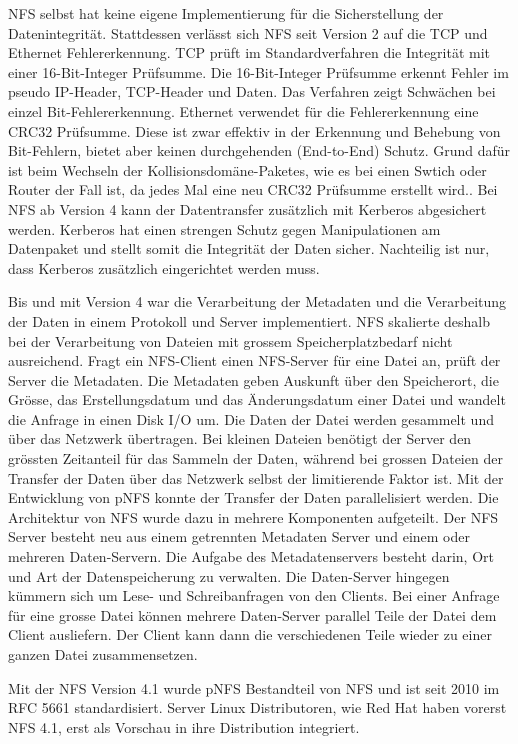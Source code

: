 NFS selbst hat keine eigene Implementierung für die Sicherstellung der Datenintegrität. Stattdessen verlässt sich NFS seit Version 2 auf die TCP und Ethernet Fehlererkennung. TCP prüft im Standardverfahren die Integrität mit einer 16-Bit-Integer Prüfsumme. Die 16-Bit-Integer Prüfsumme erkennt Fehler im pseudo IP-Header, TCP-Header und Daten. Das Verfahren zeigt Schwächen bei einzel Bit-Fehlererkennung. Ethernet verwendet für die Fehlererkennung eine CRC32 Prüfsumme. Diese ist zwar effektiv in der Erkennung und Behebung von Bit-Fehlern, bietet aber keinen durchgehenden (End-to-End) Schutz. Grund dafür ist beim Wechseln der Kollisionsdomäne-Paketes, wie es bei einen Swtich oder Router der Fall ist, da jedes Mal eine neu CRC32 Prüfsumme erstellt wird.\cite{JohnL.202}. Bei NFS ab Version 4 kann der Datentransfer zusätzlich mit Kerberos abgesichert werden. Kerberos hat einen strengen Schutz gegen Manipulationen am Datenpaket und stellt somit die Integrität der Daten sicher. Nachteilig ist nur, dass Kerberos zusätzlich eingerichtet werden muss. 

Bis und mit Version 4 war die Verarbeitung der Metadaten und die Verarbeitung der Daten in einem Protokoll und Server implementiert. NFS skalierte deshalb bei der Verarbeitung von Dateien mit grossem Speicherplatzbedarf nicht ausreichend. Fragt ein NFS-Client einen NFS-Server für eine Datei an, prüft der Server die Metadaten. Die Metadaten geben Auskunft über den Speicherort, die Grösse, das Erstellungsdatum und das Änderungsdatum einer Datei und wandelt die Anfrage in einen Disk I/O um. Die Daten der Datei werden gesammelt und über das Netzwerk übertragen. Bei kleinen Dateien benötigt der Server den grössten Zeitanteil für das Sammeln der Daten, während bei grossen Dateien der Transfer der Daten über das Netzwerk selbst der limitierende Faktor ist.
Mit der Entwicklung von pNFS konnte der Transfer der Daten parallelisiert werden. Die Architektur von NFS wurde dazu in mehrere Komponenten aufgeteilt. Der NFS Server besteht neu aus einem getrennten Metadaten Server und einem oder mehreren Daten-Servern. Die Aufgabe des Metadatenservers besteht darin, Ort und Art der Datenspeicherung zu verwalten. Die Daten-Server hingegen kümmern sich um Lese- und Schreibanfragen von den Clients.
Bei einer Anfrage für eine grosse Datei können mehrere Daten-Server parallel Teile der Datei dem Client ausliefern. Der Client kann dann die verschiedenen Teile wieder zu einer ganzen Datei zusammensetzen. \cite{Shepler2010}\cite{Group2010}

Mit der NFS Version 4.1 wurde pNFS Bestandteil von NFS und ist seit 2010 im \gls{RFC} 5661 standardisiert. Server Linux Distributoren, wie Red Hat haben vorerst NFS 4.1, erst als Vorschau in ihre Distribution integriert.\cite{EastJacquelynnMichaelHidep-Smith2011}




